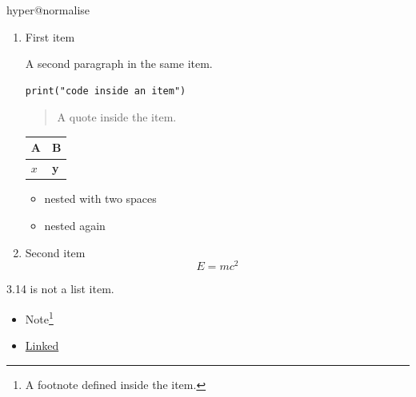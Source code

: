 \ifcsname hyper@normalise\endcsname\else\PackageError{mark2tex}{Markdown links require hyperref}{Load \string\usepackage{hyperref} in the document preamble.}\fi
\begin{frame}[t,fragile]
\begin{enumerate}
\item First item

A second paragraph in the same item.

\begin{verbatim}
print("code inside an item")
\end{verbatim}

\begin{quote}
A quote inside the item.
\end{quote}

\par\addvspace{\medskipamount}
\noindent\begin{tabularx}{\linewidth}{@{}>{\raggedright\arraybackslash}X>{\raggedright\arraybackslash}X@{}}
\toprule
A & B \\
\midrule
$x$ & \textbf{y} \\
\bottomrule
\end{tabularx}
\par\addvspace{\medskipamount}
\begin{itemize}
\item nested with two spaces
\item nested again
\end{itemize}
\item Second item
\[
E = mc^2
\]
\end{enumerate}
3.14 is not a list item.

\begin{itemize}
\item Note\footnote{\label{mark2tex:footnote:88cf43d55c883d1c1357c8dc91ca7f8d:1}A footnote defined inside the item.}
\item \href{\detokenize{https://example.org}}{Linked}
\end{itemize}
\end{frame}

